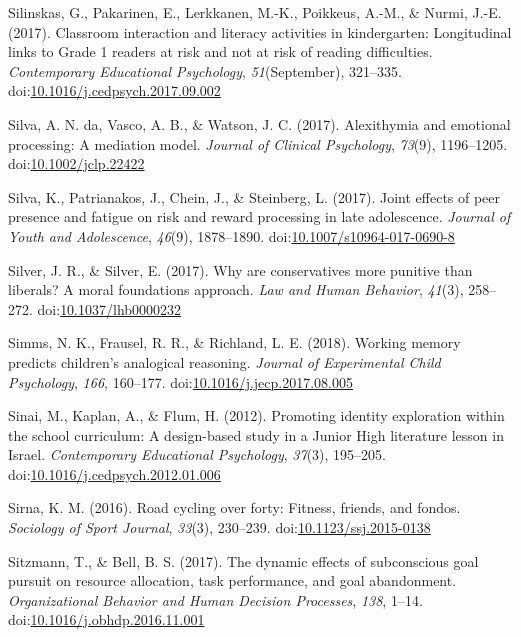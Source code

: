 \documentclass[english,man]{apa6}
\theoremstyle{definition}
\theoremstyle{definition}
\theoremstyle{definition}
\theoremstyle{remark}
\begin{document}
\hypertarget{ref-Silinskas2017}{}
Silinskas, G., Pakarinen, E., Lerkkanen, M.-K., Poikkeus, A.-M., \&
Nurmi, J.-E. (2017). Classroom interaction and literacy activities in
kindergarten: Longitudinal links to Grade 1 readers at risk and not at
risk of reading difficulties. \emph{Contemporary Educational
Psychology}, \emph{51}(September), 321--335.
doi:\href{https://doi.org/10.1016/j.cedpsych.2017.09.002}{10.1016/j.cedpsych.2017.09.002}

\hypertarget{ref-DaSilva2017}{}
Silva, A. N. da, Vasco, A. B., \& Watson, J. C. (2017). Alexithymia and
emotional processing: A mediation model. \emph{Journal of Clinical
Psychology}, \emph{73}(9), 1196--1205.
doi:\href{https://doi.org/10.1002/jclp.22422}{10.1002/jclp.22422}

\hypertarget{ref-Silva2017}{}
Silva, K., Patrianakos, J., Chein, J., \& Steinberg, L. (2017). Joint
effects of peer presence and fatigue on risk and reward processing in
late adolescence. \emph{Journal of Youth and Adolescence}, \emph{46}(9),
1878--1890.
doi:\href{https://doi.org/10.1007/s10964-017-0690-8}{10.1007/s10964-017-0690-8}

\hypertarget{ref-Silver2017}{}
Silver, J. R., \& Silver, E. (2017). Why are conservatives more punitive
than liberals? A moral foundations approach. \emph{Law and Human
Behavior}, \emph{41}(3), 258--272.
doi:\href{https://doi.org/10.1037/lhb0000232}{10.1037/lhb0000232}

\hypertarget{ref-Simms2018}{}
Simms, N. K., Frausel, R. R., \& Richland, L. E. (2018). Working memory
predicts children's analogical reasoning. \emph{Journal of Experimental
Child Psychology}, \emph{166}, 160--177.
doi:\href{https://doi.org/10.1016/j.jecp.2017.08.005}{10.1016/j.jecp.2017.08.005}

\hypertarget{ref-Sinai2012}{}
Sinai, M., Kaplan, A., \& Flum, H. (2012). Promoting identity
exploration within the school curriculum: A design-based study in a
Junior High literature lesson in Israel. \emph{Contemporary Educational
Psychology}, \emph{37}(3), 195--205.
doi:\href{https://doi.org/10.1016/j.cedpsych.2012.01.006}{10.1016/j.cedpsych.2012.01.006}

\hypertarget{ref-Sirna2016}{}
Sirna, K. M. (2016). Road cycling over forty: Fitness, friends, and
fondos. \emph{Sociology of Sport Journal}, \emph{33}(3), 230--239.
doi:\href{https://doi.org/10.1123/ssj.2015-0138}{10.1123/ssj.2015-0138}

\hypertarget{ref-Sitzmann2017}{}
Sitzmann, T., \& Bell, B. S. (2017). The dynamic effects of subconscious
goal pursuit on resource allocation, task performance, and goal
abandonment. \emph{Organizational Behavior and Human Decision
Processes}, \emph{138}, 1--14.
doi:\href{https://doi.org/10.1016/j.obhdp.2016.11.001}{10.1016/j.obhdp.2016.11.001}
\end{document}
